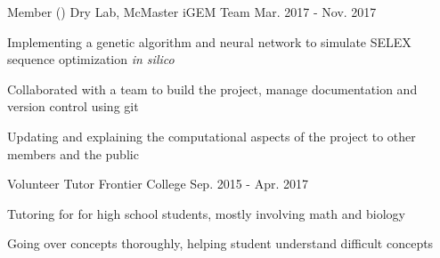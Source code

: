 \begin{cventries}
{\begin{cvitems}
        \end{cvitems}
      }
	\cventry
      {Member ()}
      {Dry Lab, McMaster iGEM Team}
      {Mar. 2017 - Nov. 2017}
      {}%
      {
        \begin{cvitems}
          \item{Implementing a genetic algorithm and neural network to simulate SELEX sequence optimization \textit{in silico}}
          \item{Collaborated with a team to build the project, manage documentation and version control using git}
          \item{Updating and explaining the computational aspects of the project to other members and the public}
        \end{cvitems}
      }
  \cventry
    {Volunteer Tutor} %
    {Frontier College}
    {Sep. 2015 - Apr. 2017} %
    {}
    {
      \begin{cvitems}
        \item{Tutoring for for high school students, mostly involving math and biology}
        \item{Going over concepts thoroughly, helping student understand difficult concepts}
      \end{cvitems}
    }
\end{cventries}
